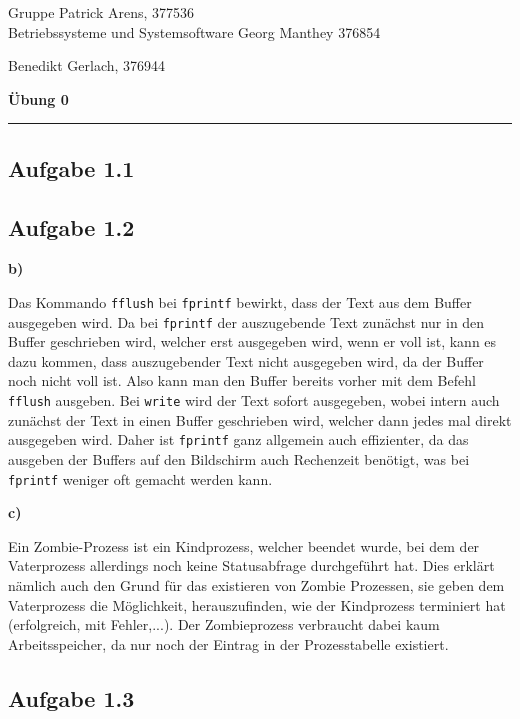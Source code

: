 \documentclass[a4paper,graphics,11pt]{article}
\newcommand{\aufgabe}[1]{\subsection*{Aufgabe #1}}
\begin{document}
    \noindent Gruppe              \hfill Patrick Arens, 377536\\
    \noindent Betriebssysteme und Systemsoftware    \hfill Georg Manthey 376854\\
    \strut\hfill Benedikt Gerlach, 376944\\
    \begin{center}
        \LARGE{\textbf{Übung 0}}
    \end{center}
    \begin{center}
    \rule[0.1ex]{\textwidth}{1pt}
    \end{center}
    
    \aufgabe{1.1}

    \aufgabe{1.2}

    \textbf{b)}

    Das Kommando \verb+fflush+ bei \verb+fprintf+ bewirkt, dass der Text aus dem Buffer ausgegeben wird. Da bei \verb+fprintf+ der auszugebende Text zunächst nur in den Buffer geschrieben wird, welcher erst ausgegeben wird, wenn er voll ist, kann es dazu kommen, dass auszugebender Text nicht ausgegeben wird, da der Buffer noch nicht voll ist. Also kann man den Buffer bereits vorher mit dem Befehl \verb+fflush+ ausgeben. Bei \verb+write+ wird der Text sofort ausgegeben, wobei intern auch zunächst der Text in einen Buffer geschrieben wird, welcher dann jedes mal direkt ausgegeben wird. Daher ist \verb+fprintf+ ganz allgemein auch effizienter, da das ausgeben der Buffers auf den Bildschirm auch Rechenzeit benötigt, was bei \verb+fprintf+ weniger oft gemacht werden kann.

    \textbf{c)}

    Ein Zombie-Prozess ist ein Kindprozess, welcher beendet wurde, bei dem der Vaterprozess allerdings noch keine Statusabfrage durchgeführt hat. Dies erklärt nämlich auch den Grund für das existieren von Zombie Prozessen, sie geben dem Vaterprozess die Möglichkeit, herauszufinden, wie der Kindprozess terminiert hat (erfolgreich, mit Fehler,...). Der Zombieprozess verbraucht dabei kaum Arbeitsspeicher, da nur noch der Eintrag in der Prozesstabelle existiert.

    \aufgabe{1.3}
    
    
\end{document}
